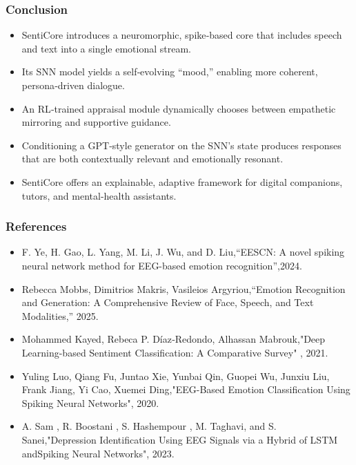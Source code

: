 \documentclass[aspectratio=169]{beamer}
\begin{document}
\begin{frame}
    \frametitle{Conclusion}
    \begin{itemize}
        \item SentiCore introduces a neuromorphic, spike‑based core that includes speech and text into a single emotional stream.  
        \item Its SNN model yields a self‑evolving “mood,” enabling more coherent, persona‑driven dialogue.  
        \item An RL‑trained appraisal module dynamically chooses between empathetic mirroring and supportive guidance.  
        \item Conditioning a GPT‑style generator on the SNN’s state produces responses that are both contextually relevant and emotionally resonant.  
        \item SentiCore offers an explainable, adaptive framework for digital companions, tutors, and mental‑health assistants.  
    \end{itemize}
\end{frame}


\begin{frame}
    \frametitle{References}
    \begin{itemize}
 \item  F. Ye, H. Gao, L. Yang, M. Li, J. Wu, and D. Liu,“EESCN: A novel spiking neural network method for EEG-based emotion recognition”,2024.
 \item Rebecca Mobbs, Dimitrios Makris, Vasileios Argyriou,“Emotion Recognition and Generation: A Comprehensive Review of Face, Speech, and Text Modalities,” 2025.
 \item Mohammed Kayed, Rebeca P. Díaz‑Redondo, Alhassan Mabrouk,"Deep Learning-based Sentiment Classification: A Comparative Survey" , 2021.
  \item Yuling Luo, Qiang Fu, Juntao Xie, Yunbai Qin, Guopei Wu, Junxiu Liu, Frank Jiang, Yi Cao, Xuemei Ding,"EEG-Based Emotion Classification Using Spiking Neural Networks", 2020.
 \item A. Sam , R. Boostani , S. Hashempour , M. Taghavi, and S. Sanei,"Depression Identification Using EEG Signals via a Hybrid of LSTM andSpiking Neural Networks", 2023.
    \end{itemize}
\end{frame}
\end{document}
